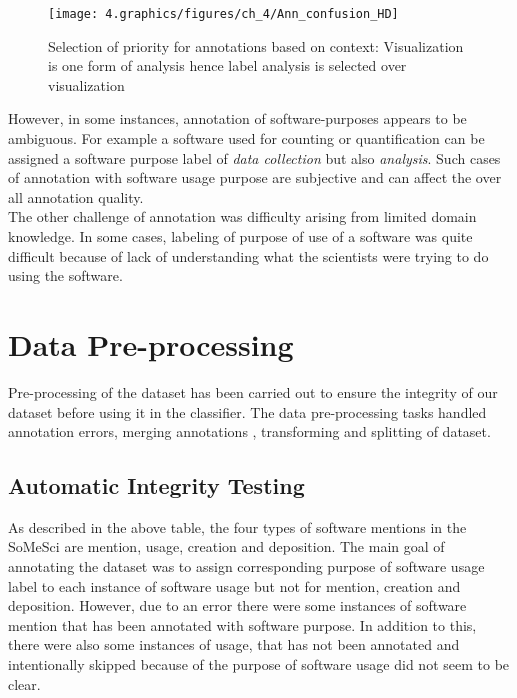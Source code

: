 \begin{figure}[htbp]
	\centering
	\texttt{[image: 4.graphics/figures/ch\_4/Ann\_confusion\_HD]}
	\caption{Selection of priority for annotations based on context: Visualization is one form of analysis hence label analysis is selected over visualization }
	\label{fig:chapter04:setup}
\end{figure}

However, in some instances, annotation of software-purposes appears to be ambiguous. For example a software used for counting or quantification can be assigned a software purpose label of  \emph{data collection} but also \emph{analysis}. Such cases of annotation with software usage purpose are subjective and can affect the over all annotation quality.\\

The other challenge of annotation was difficulty arising from limited domain knowledge. In some cases, labeling of purpose of use of a software was quite difficult because of lack of understanding what the scientists were trying to do using the software.

\section{Data Pre-processing}
\label{sec:dataset:preprocessing}
Pre-processing of the dataset has been carried out to ensure the integrity of our dataset before using it in the classifier. The data pre-processing tasks handled annotation errors, merging annotations , transforming and splitting of dataset. 

\subsection{Automatic Integrity Testing }
\label{subsec:dataset:preprocessing:handlingerrors}

As described in the above table, the four types of software mentions in the SoMeSci are mention, usage, creation and deposition. The main goal of annotating the dataset was to assign corresponding purpose of software usage label to each instance of software usage but not for mention, creation and deposition. However, due to an error there were some instances of software mention that has been annotated with software purpose. In addition to this, there were also some instances of usage, that has not been annotated and intentionally skipped because of the purpose of software usage did not seem to be clear. \\

